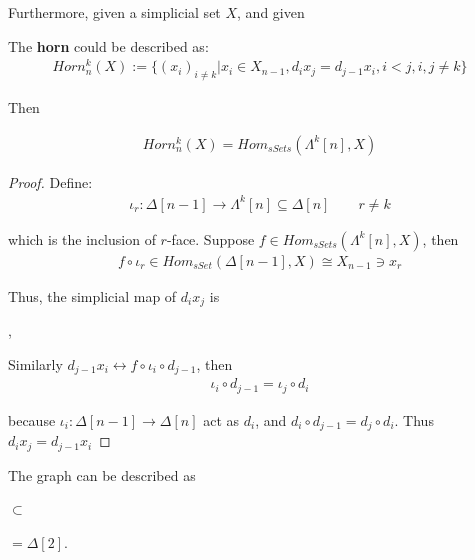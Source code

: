 \documentclass[Total.tex]{subfiles}
\begin{document}
			Furthermore, given a simplicial set $X$, and given
			\begin{Def}
				The \textbf{horn} could be described as:
				\begin{gather*}
					Horn^k_n(X):=\{(x_i)_{i\not=k}|x_i\in X_{n-1}, d_ix_j=d_{j-1}x_i,i<j,i,j\not=k\}
				\end{gather*}
			\end{Def}
			
			Then
			\begin{proposition}
				\begin{gather*}
					Horn^k_n(X)=Hom_{sSets}(\Lambda^k[n],X)
				\end{gather*}
			\end{proposition}
			\begin{proof}
				Define:
				\begin{gather*}
					\iota_r:\Delta[n-1]\rightarrow \Lambda^k[n]\subseteq \Delta[n]\qquad r\not=k
				\end{gather*}
				
				which is the inclusion of $r$-face. Suppose $f\in Hom_{sSets}(\Lambda^k[n],X)$, then
				\begin{gather*}
					f\circ \iota_r\in Hom_{sSet}(\Delta[n-1],X)\cong X_{n-1}\ni x_r
				\end{gather*}
				
				Thus, the simplicial map of $d_i x_j$ is
				\begin{center}
					,
				\end{center}
				
				Similarly $d_{j-1}x_i\leftrightarrow f\circ \iota_i\circ d_{j-1}$, then
				\begin{gather*}
					\iota_i\circ d_{j-1}=\iota_j\circ d_{i}
				\end{gather*}
				
				because $\iota_i:\Delta[n-1]\rightarrow \Delta[n]$ act as $d_i$, and $d_i\circ d_{j-1}=d_j\circ d_i$. Thus $d_ix_j=d_{j-1}x_i$
			\end{proof}
			
			The graph can be described as
			\begin{center}
				$\subset$ $=\Delta[2]$. 
			\end{center}
			
\end{document}

